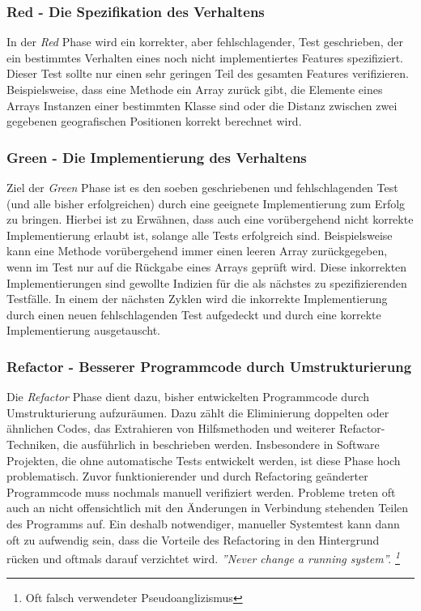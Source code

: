 \subsubsection{Red - Die Spezifikation des Verhaltens}

In der \textit{Red} Phase wird ein korrekter, aber fehlschlagender,
Test geschrieben, der ein bestimmtes Verhalten eines noch nicht
implementiertes Features spezifiziert. Dieser Test sollte nur einen
sehr geringen Teil des gesamten Features
verifizieren. Beispielsweise, dass eine Methode ein Array zurück gibt,
die Elemente eines Arrays Instanzen einer bestimmten Klasse sind oder
die Distanz zwischen zwei gegebenen geografischen Positionen korrekt
berechnet wird.

\subsubsection{Green - Die Implementierung des Verhaltens}

Ziel der \textit{Green} Phase ist es den soeben geschriebenen und
fehlschlagenden Test (und alle bisher erfolgreichen) durch eine
geeignete Implementierung zum Erfolg zu bringen. Hierbei ist zu
Erwähnen, dass auch eine vorübergehend nicht korrekte Implementierung
erlaubt ist, solange alle Tests erfolgreich sind. Beispielsweise kann
eine Methode vorübergehend immer einen leeren Array zurückgegeben,
wenn im Test nur auf die Rückgabe eines Arrays geprüft wird. Diese
inkorrekten Implementierungen sind gewollte Indizien für die als
nächstes zu spezifizierenden Testfälle. In einem der nächsten Zyklen
wird die inkorrekte Implementierung durch einen neuen fehlschlagenden
Test aufgedeckt und durch eine korrekte Implementierung ausgetauscht.

\subsubsection{Refactor - Besserer Programmcode durch
  Umstrukturierung}

Die \textit{Refactor} Phase dient dazu, bisher entwickelten
Programmcode durch Umstrukturierung aufzuräumen. Dazu zählt die
Eliminierung doppelten oder ähnlichen Codes, das Extrahieren von
Hilfsmethoden und weiterer Refactor-Techniken, die ausführlich in
\cite{Fowler1999} beschrieben werden. Insbesondere in Software
Projekten, die ohne automatische Tests entwickelt werden, ist diese
Phase hoch problematisch. Zuvor funktionierender und durch Refactoring
geänderter Programmcode muss nochmals manuell verifiziert
werden. Probleme treten oft auch an nicht offensichtlich mit den
Änderungen in Verbindung stehenden Teilen des Programms auf. Ein
deshalb notwendiger, manueller Systemtest kann dann oft zu aufwendig
sein, dass die Vorteile des Refactoring in den Hintergrund rücken und
oftmals darauf verzichtet wird.  \textit{''Never change a running
  system''. \footnote{Oft falsch verwendeter Pseudoanglizismus}}

